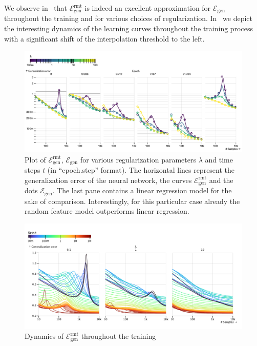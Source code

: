 We observe in~ that $\mathcal E^\mathrm{rmt}_\mathrm{gen}$ is indeed an excellent approximation for $\mathcal E_\mathrm{gen}$ throughout the training and for various choices of regularization. In~ we depict the interesting dynamics of the learning curves throughout the training process with a significant shift of the interpolation threshold to the left. 
\begin{figure}[ht]
    \centering
    \includegraphics[width=\linewidth]{chapters/deeprf/figs/real_emp.pdf}
    \caption{Plot of $\mathcal E^\mathrm{rmt}_\mathrm{gen}$, $\mathcal E_\mathrm{gen}$ for various regularization parameters $\lambda$ and time steps $t$ (in ``epoch.step'' format). The horizontal lines represent the generalization error of the neural network, the curves $\mathcal E^\mathrm{rmt}_\mathrm{gen}$ and the dots $\mathcal E_\mathrm{gen}$. The last pane contains a linear regression model for the sake of comparison. Interestingly, for this particular case already the random feature model outperforms linear regression.}
    \label{fig:real_emp}
\end{figure}
\begin{figure}[ht]
    \centering
    \includegraphics[width=\linewidth]{chapters/deeprf/figs/real_det.pdf}
    \caption{Dynamics of $\mathcal E^\mathrm{rmt}_\mathrm{gen}$ throughout the training}
    \label{fig:real_det}
\end{figure}

